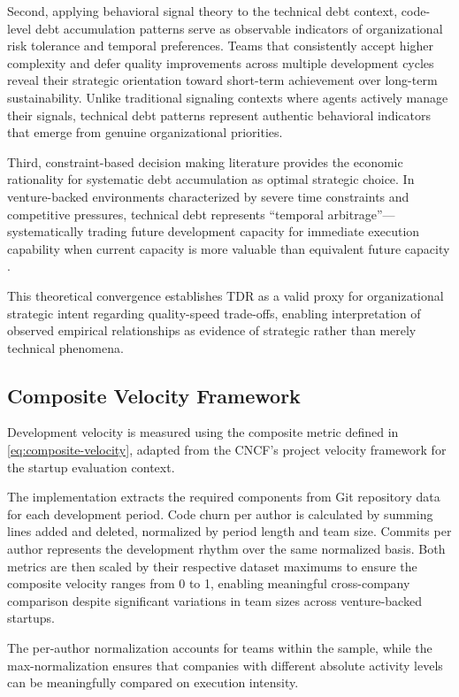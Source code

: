 Second, applying behavioral signal theory \citep{spence1973job} to the technical debt context, code-level debt accumulation patterns serve as observable indicators of organizational risk tolerance and temporal preferences. Teams that consistently accept higher complexity and defer quality improvements across multiple development cycles reveal their strategic orientation toward short-term achievement over long-term sustainability. Unlike traditional signaling contexts where agents actively manage their signals, technical debt patterns represent authentic behavioral indicators that emerge from genuine organizational priorities.

Third, constraint-based decision making literature \citep{simon1955behavioral} provides the economic rationality for systematic debt accumulation as optimal strategic choice. In venture-backed environments characterized by severe time constraints and competitive pressures, technical debt represents ``temporal arbitrage''—systematically trading future development capacity for immediate execution capability when current capacity is more valuable than equivalent future capacity \citep{fisher1930theory}.

This theoretical convergence establishes \ac{TDR} as a valid proxy for organizational strategic intent regarding quality-speed trade-offs, enabling interpretation of observed empirical relationships as evidence of strategic rather than merely technical phenomena.

\subsection{Composite Velocity Framework}

Development velocity is measured using the composite metric defined in \autoref{eq:composite-velocity}, adapted from the CNCF's project velocity framework for the startup evaluation context. 

The implementation extracts the required components from Git repository data for each development period. Code churn per author is calculated by summing lines added and deleted, normalized by period length and team size. Commits per author represents the development rhythm over the same normalized basis. Both metrics are then scaled by their respective dataset maximums to ensure the composite velocity ranges from 0 to 1, enabling meaningful cross-company comparison despite significant variations in team sizes across venture-backed startups.

The per-author normalization accounts for teams within the sample, while the max-normalization ensures that companies with different absolute activity levels can be meaningfully compared on execution intensity.

